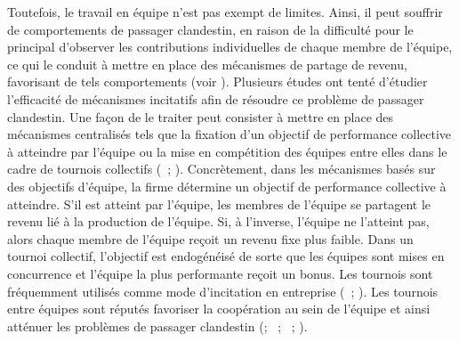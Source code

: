 \begin{Article}
\begin{refsection}[Lebourges]
Toutefois, le travail en équipe n'est pas exempt de limites. Ainsi, il
peut souffrir de comportements de passager clandestin, en raison de la
difficulté pour le principal d'observer les contributions individuelles
de chaque membre de l'équipe, ce qui le conduit à mettre en place des
mécanismes de partage de revenu, favorisant de tels comportements (voir
\textcite{Holmstrom1982}). Plusieurs études ont tenté d'étudier l'efficacité
de mécanismes incitatifs afin de résoudre ce problème de passager
clandestin. Une façon de le traiter peut consister à mettre en place des
mécanismes centralisés tels que la fixation d'un objectif de performance
collective à atteindre par l'équipe ou la mise en compétition des
équipes entre elles dans le cadre de tournois collectifs (\textcite{Holmstrom1982}~; \textcite{NalbantianSchotter1997}). Concrètement, dans les
mécanismes basés sur des objectifs d'équipe, la firme détermine un
objectif de performance collective à atteindre. S'il est atteint par
l'équipe, les membres de l'équipe se partagent le revenu lié à la
production de l'équipe. Si, à l'inverse, l'équipe ne l'atteint pas,
alors chaque membre de l'équipe reçoit un revenu fixe plus faible. Dans
un tournoi collectif, l'objectif est endogénéisé de sorte que les
équipes sont mises en concurrence et l'équipe la plus performante reçoit
un bonus. Les tournois sont fréquemment utilisés comme mode d'incitation
en entreprise (\textcite{MerchantVanderStede2007}~; \textcite{Sheremeta2016}). Les tournois entre équipes sont réputés favoriser la
coopération au sein de l'équipe et ainsi atténuer les problèmes de
passager clandestin (\textcite{DragonGarveyTurnbull1996}; \textcite{VanDijkSonnemansVanWinden2001}~; \textcite{AbbinkBrandtsHerrmannOrzen2010}~;
\textcite{Sheremeta2018}).


\end{refsection}
\end{Article}
